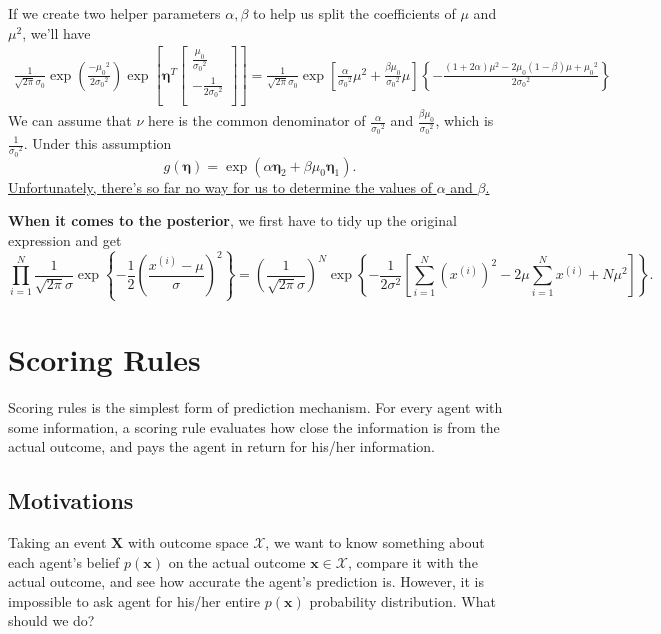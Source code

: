 \documentclass[12pt]{article}
\begin{document}
If we create two helper parameters $\alpha,\beta$ to help us split the coefficients of $\mu$ and $\mu^2$, we'll have
\begin{equation}
    \begin{split}
        \frac{1}{\sqrt{2 \pi} \sigma_{0}}\exp{\left(\frac{-{\mu_0}^2}{2{\sigma_0}^2}\right)}\exp{\left[\boldsymbol{\eta}^T\begin{bmatrix}
                    \frac{\mu_0}{{\sigma_0}^2} \\
                    -\frac{1}{2{\sigma_0}^2}   \\
                \end{bmatrix}\right]}
        =\frac{1}{\sqrt{2 \pi} \sigma_{0}}\exp{\left[\frac{\alpha}{{\sigma_0}^2}{\mu}^2+\frac{\beta\mu_0}{{\sigma_0}^2}\mu\right]\left\{-\frac{(1+2\alpha)\mu^2-2{\mu_0}(1-\beta)\mu+{\mu_0}^2}{2{\sigma_0}^2}\right\}}
    \end{split}
\end{equation}
We can assume that $\nu$ here is the common denominator of $\frac{\alpha}{{\sigma_0}^2}$ and $\frac{\beta\mu_0}{{\sigma_0}^2}$, which is $\frac{1}{{\sigma_0}^2}$. Under this assumption $$g(\boldsymbol{\eta})=\exp(\alpha{\boldsymbol{\eta}}_2+\beta\mu_0{\boldsymbol{\eta}}_1).$$
\ul{Unfortunately, there's so far no way for us to determine the values of $\alpha$ and $\beta$.}

\textbf{When it comes to the posterior}, we first have to tidy up the original expression and get
\[\prod_{i=1}^N\frac{1}{\sqrt{2\pi}\sigma}\exp\left\{ -\frac{1}{2}\left( \frac{x^{(i)}-\mu}{\sigma} \right)^2\right\}=\left( \frac{1}{\sqrt{2\pi}\sigma} \right)^N\exp\left\{ -\frac{1}{2\sigma^2}\left[ \sum_{i=1}^N\left( x^{(i)} \right)^2-2\mu\sum_{i=1}^N x^{(i)}+N\mu^2 \right]\right\}.\]


\newpage
\section{Scoring Rules}
Scoring rules is the simplest form of prediction mechanism. For every agent with some information, a scoring rule evaluates how close the information is from the actual outcome, and pays the agent in return for his/her information.

\subsection{Motivations}
Taking an event $\mathbf{X}$ with outcome space $\mathcal{X}$, we want to know something about each agent's belief $p(\mathbf{x})$ on the actual outcome $\mathbf{x}\in \mathcal{X}$, compare it with the actual outcome, and see how accurate the agent's prediction is. However, it is impossible to ask agent for his/her entire $p(\mathbf{x})$ probability distribution. What should we do?
\end{document}
